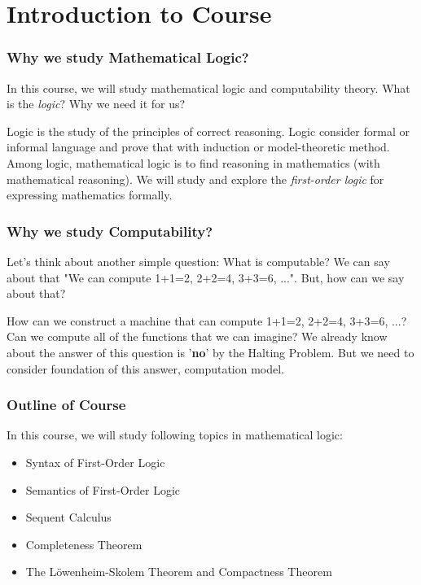 \section{Introduction to Course}

\begin{frame}
    \frametitle{Why we study Mathematical Logic?}

    In this course, we will study mathematical logic and computability theory.
    What is the \textit{logic}? Why we need it for us?

    Logic is the study of the principles of correct reasoning.
    Logic consider formal or informal language and prove that with induction or model-theoretic method.
    Among logic, mathematical logic is to find reasoning in mathematics (with mathematical reasoning).
    We will study and explore the \textit{first-order logic} for expressing mathematics formally.

\end{frame}

\begin{frame}
    \frametitle{Why we study Computability?}
    
    Let's think about another simple question: What is computable?
    We can say about that "We can compute 1+1=2, 2+2=4, 3+3=6, ...". But, how can we say about that?
    
    How can we construct a machine that can compute 1+1=2, 2+2=4, 3+3=6, ...?
    Can we compute all of the functions that we can imagine?
    We already know about the answer of this question is '\textbf{no}' by the Halting Problem.
    But we need to consider foundation of this answer, computation model.

\end{frame}

\begin{frame}
    \frametitle{Outline of Course}

    In this course, we will study following topics in mathematical logic:
    \begin{itemize}
        \item Syntax of First-Order Logic
        \item Semantics of First-Order Logic
        \item Sequent Calculus
        \item Completeness Theorem
        \item The L\"owenheim-Skolem Theorem and Compactness Theorem
    \end{itemize}

\end{frame}

